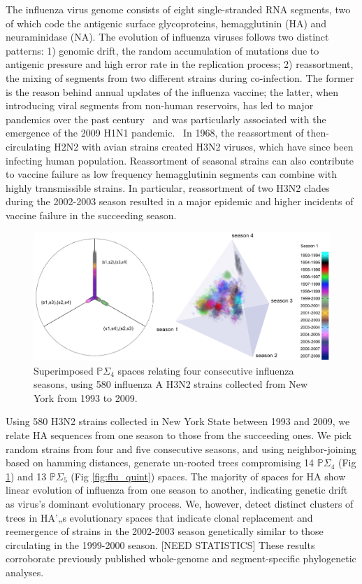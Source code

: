 \documentclass[a4paper,11pt]{article}
\begin{document}
The influenza virus genome consists of eight single-stranded RNA segments, two of which code the antigenic surface glycoproteins, hemagglutinin (HA) and neuraminidase (NA).
The evolution of influenza viruses follows two distinct patterns: 1) genomic drift, the random accumulation of mutations due to antigenic pressure and high error rate in the replication process; 2) reassortment, the mixing of segments from two different strains during co-infection.
The former is the reason behind annual updates of the influenza vaccine; the latter, when introducing viral segments from non-human reservoirs, has led to major pandemics over the past century~\cite{rabadan2007evolution, rabadan2008non} and  was particularly associated with the emergence of the 2009 H1N1 pandemic.~\cite{trifonov2009geographic, solovyov2009cluster}
In 1968, the reassortment of then-circulating H2N2 with avian strains created H3N2 viruses, which have since been infecting human population.
Reassortment of seasonal strains can also contribute to vaccine failure as low frequency hemagglutinin segments can combine with highly transmissible strains. In particular, reassortment of two H3N2 clades during the 2002-2003 season resulted in a major epidemic and higher incidents of vaccine failure in the succeeding season.~\cite{centers2004preliminary}

\begin{figure}
    \centering
    \includegraphics[width=6in]{figures/influenza_quad.png}
    \caption{Superimposed $\mathbb{P}\Sigma_4$ spaces relating four consecutive influenza seasons, using 580 influenza A H3N2 strains collected from New York from 1993 to 2009.}
    \label{fig:flu_quad}
\end{figure} 

Using 580 H3N2 strains collected in New York State between 1993 and 2009, we relate HA sequences from one season to those from the succeeding ones.
We pick random strains from four and five consecutive seasons, and using neighbor-joining based on hamming distances, generate un-rooted trees compromising 14 $\mathbb{P}\Sigma_4$ (Fig \ref{fig:flu_quad}) and 13 $\mathbb{P}\Sigma_5$  (Fig \ref{fig:flu_quint}) spaces.
The majority of spaces for HA show linear evolution of influenza from one season to another, indicating genetic drift as virus's dominant evolutionary process.
We, however, detect distinct clusters of trees in HA'„s evolutionary spaces that indicate clonal replacement and reemergence of strains in the 2002-2003 season genetically similar to those circulating in the 1999-2000 season. [NEED STATISTICS]
These results corroborate previously published whole-genome and segment-specific phylogenetic analyses.~\cite{holmes2005whole}
\end{document}
